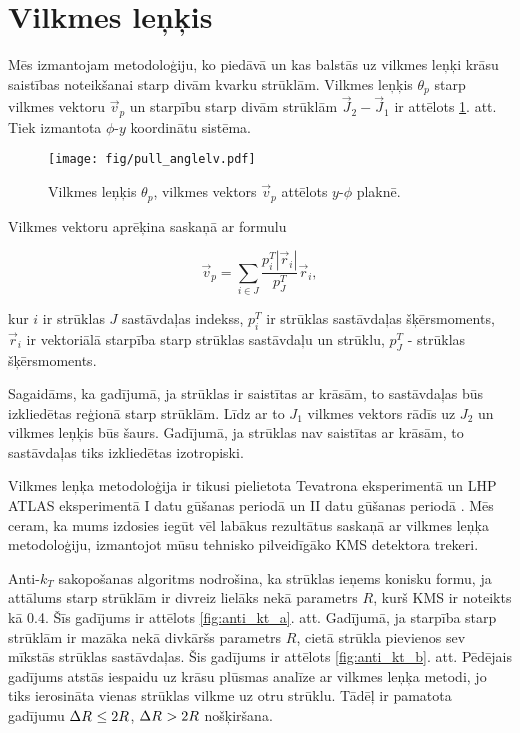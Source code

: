 \section{Vilkmes leņķis}

Mēs izmantojam metodoloģiju, ko piedāvā \cite{Gallicchio:2010sw} un kas balstās uz vilkmes leņķi krāsu saistības noteikšanai starp divām kvarku strūklām. Vilkmes leņķis $\theta_{p}$ starp vilkmes vektoru $\vec{v}_{p}$ un starpību starp divām strūklām $\vec{J}_{2}-\vec{J}_{1}$ ir attēlots \ref{fig:pull_angle}. att. Tiek izmantota $\phi$-$y$ koordinātu sistēma. 

\begin{figure}[hbtp]
  \centering
  \texttt{[image: fig/pull\_anglelv.pdf]}
  \caption{Vilkmes leņķis $\theta_{p}$, vilkmes vektors $\vec{v}_{p}$ attēlots $y$-$\phi$ plaknē.}
  \label{fig:pull_angle}
\end{figure}

Vilkmes vektoru aprēķina saskaņā ar formulu

\begin{equation}
  \vec{v}_{p}=\sum_{i\in J}\frac{p^{T}_{i}|\vec{r}_{i}|}{p^{T}_{J}}\vec{r}_{i},
  \label{Eq:pull_angle}
\end{equation}

kur $i$ ir strūklas $J$ sastāvdaļas indekss, $p^{T}_{i}$ ir strūklas sastāvdaļas šķērsmoments, $\vec{r}_{i}$ ir vektoriālā starpība starp strūklas sastāvdaļu un strūklu, $p^{T}_{J}$ - strūklas šķērsmoments.

Sagaidāms, ka gadījumā, ja strūklas ir saistītas ar krāsām, to sastāvdaļas būs izkliedētas reģionā starp strūklām. Līdz ar to $J_{1}$ vilkmes vektors rādīs uz $J_{2}$ un vilkmes leņķis būs šaurs. Gadījumā, ja strūklas nav saistītas ar krāsām, to sastāvdaļas tiks izkliedētas izotropiski.

Vilkmes leņķa metodoloģija ir tikusi pielietota Tevatrona \DZERO eksperimentā\cite{Abazov:2011vh} un LHP ATLAS eksperimentā I datu gūšanas periodā \cite{Aad:2015lxa} un II datu gūšanas periodā \cite{ATLAS:2017iaz}. Mēs ceram, ka mums izdosies iegūt vēl labākus rezultātus saskaņā ar vilkmes leņķa metodoloģiju, izmantojot mūsu tehnisko pilveidīgāko KMS detektora trekeri.

Anti-$k_{T}$ \gls{sakopošanas} algoritms nodrošina, ka strūklas ieņems konisku formu, ja attālums starp strūklām \DeltaR ir divreiz lielāks nekā parametrs $R$, kurš KMS ir noteikts kā 0.4. Šīs gadījums ir attēlots \ref{fig:anti_kt_a}. att. Gadījumā, ja starpība starp strūklām \DeltaR ir mazāka nekā divkāršs parametrs $R$, \gls{cietā} strūkla pievienos sev mīkstās strūklas sastāvdaļas. Šis gadījums ir attēlots \ref{fig:anti_kt_b}. att. Pēdējais gadījums atstās iespaidu uz krāsu plūsmas analīze ar vilkmes leņķa metodi, jo tiks ierosināta vienas strūklas vilkme uz otru strūklu. Tādēļ ir pamatota gadījumu $\Delta R^{}\leq2R$, $\Delta R^{}>2R$ nošķiršana. 

